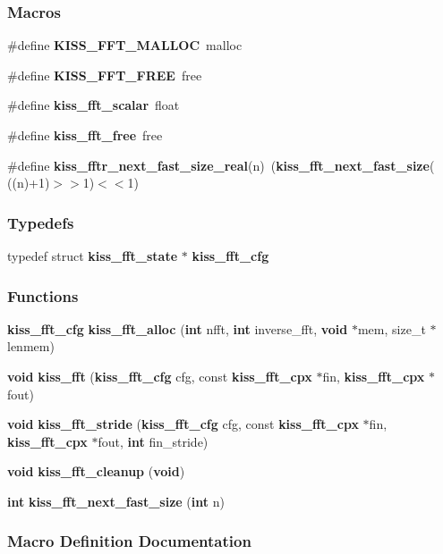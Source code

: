 \subsubsection*{Macros}
\begin{DoxyCompactItemize}
\item 
\#define {\bf K\+I\+S\+S\+\_\+\+F\+F\+T\+\_\+\+M\+A\+L\+L\+OC}~malloc
\item 
\#define {\bf K\+I\+S\+S\+\_\+\+F\+F\+T\+\_\+\+F\+R\+EE}~free
\item 
\#define {\bf kiss\+\_\+fft\+\_\+scalar}~float
\item 
\#define {\bf kiss\+\_\+fft\+\_\+free}~free
\item 
\#define {\bf kiss\+\_\+fftr\+\_\+next\+\_\+fast\+\_\+size\+\_\+real}(n)~({\bf kiss\+\_\+fft\+\_\+next\+\_\+fast\+\_\+size}( ((n)+1)$>$$>$1)$<$$<$1)
\end{DoxyCompactItemize}
\subsubsection*{Typedefs}
\begin{DoxyCompactItemize}
\item 
typedef struct {\bf kiss\+\_\+fft\+\_\+state} $\ast$ {\bf kiss\+\_\+fft\+\_\+cfg}
\end{DoxyCompactItemize}
\subsubsection*{Functions}
\begin{DoxyCompactItemize}
\item 
{\bf kiss\+\_\+fft\+\_\+cfg} {\bf kiss\+\_\+fft\+\_\+alloc} ({\bf int} nfft, {\bf int} inverse\+\_\+fft, {\bf void} $\ast$mem, size\+\_\+t $\ast$lenmem)
\item 
{\bf void} {\bf kiss\+\_\+fft} ({\bf kiss\+\_\+fft\+\_\+cfg} cfg, const {\bf kiss\+\_\+fft\+\_\+cpx} $\ast$fin, {\bf kiss\+\_\+fft\+\_\+cpx} $\ast$fout)
\item 
{\bf void} {\bf kiss\+\_\+fft\+\_\+stride} ({\bf kiss\+\_\+fft\+\_\+cfg} cfg, const {\bf kiss\+\_\+fft\+\_\+cpx} $\ast$fin, {\bf kiss\+\_\+fft\+\_\+cpx} $\ast$fout, {\bf int} fin\+\_\+stride)
\item 
{\bf void} {\bf kiss\+\_\+fft\+\_\+cleanup} ({\bf void})
\item 
{\bf int} {\bf kiss\+\_\+fft\+\_\+next\+\_\+fast\+\_\+size} ({\bf int} n)
\end{DoxyCompactItemize}


\subsubsection{Macro Definition Documentation}
